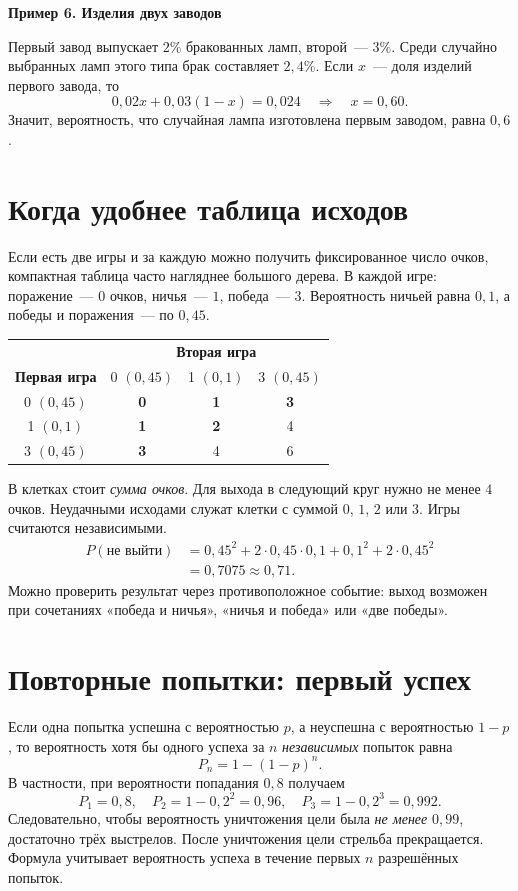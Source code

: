 \documentclass[a4paper,12pt]{article}
\newcommand{\smalltopic}[1]{\par\vspace{7pt}\noindent\textcolor{darkaccent}{\bfseries #1}\par\vspace{1pt}}
\newcommand{\ex}[1]{\needspace{9\baselineskip}\smalltopic{#1}}
\begin{document}
\ex{Пример 6. Изделия двух заводов}
Первый завод выпускает $2\%$ бракованных ламп, второй~--- $3\%$. Среди случайно выбранных ламп этого типа брак составляет $2{,}4\%$. Если $x$~--- доля изделий первого завода, то
\[
0{,}02x+0{,}03(1-x)=0{,}024
\quad\Longrightarrow\quad \boxed{x=0{,}60}.
\]
Значит, вероятность, что случайная лампа изготовлена первым заводом, равна $0{,}6$.

\section{Когда удобнее таблица исходов}
Если есть две игры и за каждую можно получить фиксированное число очков, компактная таблица часто нагляднее большого дерева. В каждой игре: поражение~--- $0$ очков, ничья~--- $1$, победа~--- $3$. Вероятность ничьей равна $0{,}1$, а победы и поражения~--- по $0{,}45$.

\begin{center}
\renewcommand{\arraystretch}{1.4}
\begin{tabular}{c|ccc}
\toprule
& \multicolumn{3}{c}{\textbf{Вторая игра}}\\
\textbf{Первая игра} & 0 $(0{,}45)$ & 1 $(0{,}1)$ & 3 $(0{,}45)$\\
\midrule
0 $(0{,}45)$ & \textbf{0} & \textbf{1} & \textbf{3}\\
1 $(0{,}1)$ & \textbf{1} & \textbf{2} & 4\\
3 $(0{,}45)$ & \textbf{3} & 4 & 6\\
\bottomrule
\end{tabular}
\end{center}
В клетках стоит \emph{сумма очков}. Для выхода в следующий круг нужно не менее $4$ очков. Неудачными исходами служат клетки с суммой $0$, $1$, $2$ или $3$. Игры считаются независимыми.
\[
\begin{aligned}
P(\text{не выйти})
&=0{,}45^2+2\cdot0{,}45\cdot0{,}1+0{,}1^2+2\cdot0{,}45^2\\
&=0{,}7075\approx\boxed{0{,}71}.
\end{aligned}
\]
Можно проверить результат через противоположное событие: выход возможен при сочетаниях «победа и ничья», «ничья и победа» или «две победы».

\section{Повторные попытки: первый успех}
Если одна попытка успешна с вероятностью $p$, а неуспешна с вероятностью $1-p$, то вероятность хотя бы одного успеха за $n$ \emph{независимых} попыток равна
\[
\boxed{P_n=1-(1-p)^n}.
\]
В частности, при вероятности попадания $0{,}8$ получаем
\[
P_1=0{,}8,\quad P_2=1-0{,}2^2=0{,}96,\quad
P_3=1-0{,}2^3=0{,}992.
\]
Следовательно, чтобы вероятность уничтожения цели была \emph{не менее} $0{,}99$, достаточно трёх выстрелов. После уничтожения цели стрельба прекращается. Формула учитывает вероятность успеха в течение первых $n$ разрешённых попыток.
\end{document}
